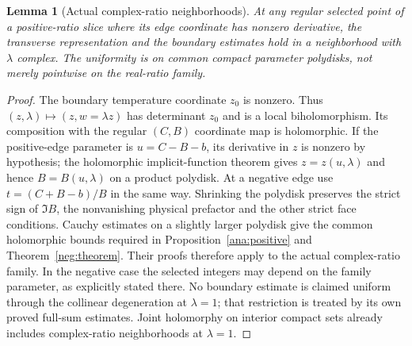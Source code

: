 \documentclass[11pt]{article}
\numberwithin{equation}{section}
\newtheorem{lemma}[theorem]{Lemma}
\theoremstyle{definition}
\begin{document}
\begin{lemma}[Actual complex-ratio neighborhoods]\label{main:complexratio}
At any regular selected point of a positive-ratio slice where its edge
coordinate has nonzero derivative, the transverse representation and
the boundary estimates hold in a neighborhood with \(\lambda\)
complex. The uniformity is on common compact parameter polydisks,
not merely pointwise on the real-ratio family.
\end{lemma}
\begin{proof}
The boundary temperature coordinate \(z_0\) is nonzero. Thus
\((z,\lambda)\mapsto(z,w=\lambda z)\) has determinant \(z_0\)
and is a local biholomorphism. Its composition with the regular
\((C,B)\) coordinate map is holomorphic. If the positive-edge
parameter is \(u=C-B-b\), its derivative in \(z\) is nonzero
by hypothesis; the holomorphic implicit-function theorem gives
\(z=z(u,\lambda)\) and hence \(B=B(u,\lambda)\) on a product
polydisk. At a negative edge use \(t=(C+B-b)/B\) in the same way.
Shrinking the polydisk preserves the strict sign of \(\Im B\),
the nonvanishing physical prefactor and the other strict face
conditions. Cauchy estimates on a slightly larger polydisk give
the common holomorphic bounds required in
Proposition~\ref{ana:positive} and Theorem~\ref{neg:theorem}.
Their proofs therefore apply to the actual complex-ratio family.
In the negative case the selected integers may depend on the
family parameter, as explicitly stated there. No boundary estimate
is claimed uniform through the collinear degeneration at
\(\lambda=1\); that restriction is treated by its own proved
full-sum estimates. Joint holomorphy on interior compact sets already
includes complex-ratio neighborhoods at \(\lambda=1\).
\end{proof}
\end{document}
